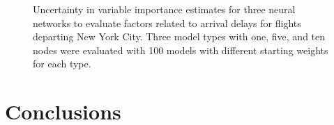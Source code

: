 \documentclass[article,shortnames]{jss}
\begin{document}
\begin{figure}[!h]
\centering
{}


\caption{Uncertainty in variable importance estimates for three neural networks to evaluate factors related to arrival delays for flights departing New York City.  Three model types with one, five, and ten nodes were evaluated with 100 models with different starting weights for each type.}
\label{fig:flightimp}
\end{figure}

\section[Conclusions]{Conclusions}
\end{document}
